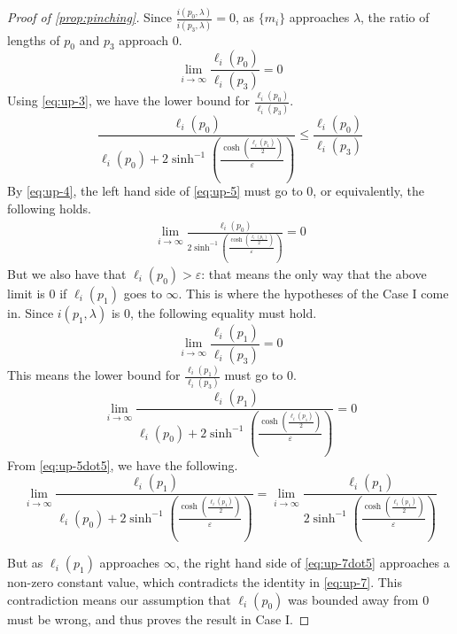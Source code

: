 \documentclass[12pt, reqno]{amsart}
\begin{document}
\begin{proof}[Proof of \autoref{prop:pinching}]
Since $\frac{i(p_0, \lambda)}{i(p_3, \lambda)} = 0$, as $\{m_i\}$ approaches $\lambda$, the ratio of lengths of $p_0$ and $p_3$ approach $0$.
\begin{equation}
  \label{eq:up-4}
  \lim_{i \to \infty} \frac{\ell_i(p_0)}{\ell_i(p_3)} = 0
\end{equation}
Using \eqref{eq:up-3}, we have the lower bound for $\frac{\ell_i(p_0)}{\ell_i(p_3)}$.
\begin{equation}
  \label{eq:up-5}
  \frac{\ell_i(p_0)}{  \ell_i(p_0) +
  2 \sinh^{-1} \left( \frac{\cosh \left( \frac{\ell_i(p_1)}{2} \right)}{\varepsilon} \right)} \leq \frac{\ell_i(p_0)}{\ell_i(p_3)}
\end{equation}
By \eqref{eq:up-4}, the left hand side of \eqref{eq:up-5} must go to $0$, or equivalently, the following holds.
\begin{align}
  \label{eq:up-5dot5}
\lim_{i \to \infty} \frac{\ell_i(p_0)}{2 \sinh^{-1} \left( \frac{\cosh \left( \frac{\ell_i(p_1)}{2} \right)}{\varepsilon} \right)}
= 0
\end{align}
But we also have that $\ell_i(p_0) > \varepsilon$: that means the only way that the above limit is $0$ if $\ell_i(p_1)$ goes to $\infty$.
This is where the hypotheses of the Case I come in.
Since $i(p_1, \lambda)$ is $0$, the following equality must hold.
\begin{equation}
  \label{eq:up-6}
  \lim_{i \to \infty} \frac{\ell_i(p_1)}{\ell_i(p_3)} = 0
\end{equation}
This means the lower bound for $\frac{\ell_i(p_1)}{\ell_i(p_3)}$ must go to $0$.
\begin{equation}
  \label{eq:up-7}
   \lim_{i \to \infty} \frac{\ell_i(p_1)}{  \ell_i(p_0) +
  2 \sinh^{-1} \left( \frac{\cosh \left( \frac{\ell_i(p_1)}{2} \right)}{\varepsilon} \right)
  } = 0
\end{equation}
From \eqref{eq:up-5dot5}, we have the following.
\begin{equation}
  \label{eq:up-7dot5}
  \lim_{i \to \infty} \frac{\ell_i(p_1)}{  \ell_i(p_0) +
  2 \sinh^{-1} \left( \frac{\cosh \left( \frac{\ell_i(p_1)}{2} \right)}{\varepsilon} \right)
  }
  =
  \lim_{i \to \infty} \frac{\ell_i(p_1)}{
  2 \sinh^{-1} \left( \frac{\cosh \left( \frac{\ell_i(p_1)}{2} \right)}{\varepsilon} \right)
  }
\end{equation}

But as $\ell_i(p_1)$ approaches $\infty$, the right hand side of \eqref{eq:up-7dot5} approaches a non-zero constant value, which contradicts the identity in \eqref{eq:up-7}.
This contradiction means our assumption that $\ell_i(p_0)$ was bounded away from $0$ must be wrong, and thus proves the result in Case I.


\end{proof}
\end{document}
